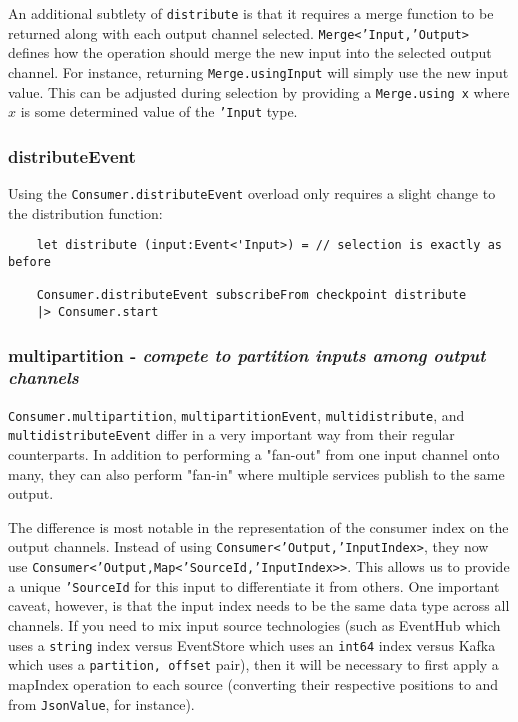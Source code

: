 \documentclass{article}
\begin{document}
An additional subtlety of \texttt{distribute} is that it requires a merge function to be returned along with each output channel selected.  \texttt{Merge<'Input,'Output>} defines how the operation should merge the new input into the selected output channel.  For instance, returning \texttt{Merge.usingInput} will simply use the new input value.  This can be adjusted during selection by providing a \texttt{Merge.using x} where $x$ is some determined value of the \texttt{'Input} type.

\subsubsection{distributeEvent}

Using the \texttt{Consumer.distributeEvent} overload only requires a slight change to the distribution function:

\begin{verbatim}
    let distribute (input:Event<'Input>) = // selection is exactly as before
        
    Consumer.distributeEvent subscribeFrom checkpoint distribute
    |> Consumer.start
\end{verbatim}

\subsubsection{multipartition - \textit{compete to partition inputs among output channels}}

\texttt{Consumer.multipartition}, \texttt{multipartitionEvent}, \texttt{multidistribute}, and \texttt{multidistributeEvent} differ in a very important way from their regular counterparts.  In addition to performing a "fan-out" from one input channel onto many, they can also perform "fan-in" where multiple services publish to the same output.

The difference is most notable in the representation of the consumer index on the output channels. Instead of using \texttt{Consumer<'Output,'InputIndex>}, they now use \texttt{Consumer<'Output,Map<'SourceId,'InputIndex>>}.  This allows us to provide a unique \texttt{'SourceId} for this input to differentiate it from others. One important caveat, however, is that the input index needs to be the same data type across all channels.  If you need to mix input source technologies (such as EventHub which uses a \texttt{string} index versus EventStore which uses an \texttt{int64} index versus Kafka which uses a \texttt{partition, offset} pair), then it will be necessary to first apply a mapIndex operation to each source (converting their respective positions to and from \texttt{JsonValue}, for instance).
\end{document}
